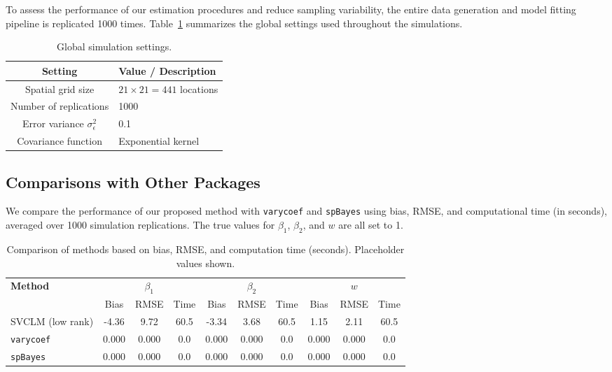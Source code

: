 To assess the performance of our estimation procedures and reduce sampling variability, the entire data generation and model fitting pipeline is replicated 1000 times. Table~\ref{tab:settings} summarizes the global settings used throughout the simulations.

\begin{table}[ht!]
\centering
\caption{Global simulation settings.}
\label{tab:settings}
\begin{tabular}{|c|l|}
\hline
\textbf{Setting} & \textbf{Value / Description} \\
\hline
Spatial grid size & $ 21 \times 21 = 441 $ locations \\
Number of replications & 1000 \\
Error variance $ \sigma^2_\epsilon $ & 0.1 \\
Covariance function & Exponential kernel \\
\hline
\end{tabular}
\end{table}

\subsection{Comparisons with Other Packages}

We compare the performance of our proposed method with \texttt{varycoef} and \texttt{spBayes} using bias, RMSE, and computational time (in seconds), averaged over 1000 simulation replications. The true values for $ \beta_1 $, $ \beta_2 $, and $ w $ are all set to 1.

\begin{table}[ht!]
\centering
\caption{Comparison of methods based on bias, RMSE, and computation time (seconds). Placeholder values shown.}
\label{tab:method-compact}
\begin{tabular}{|l|ccc|ccc|ccc|}
\hline
\textbf{Method} 
& \multicolumn{3}{c|}{ $ \beta_1 $ } 
& \multicolumn{3}{c|}{ $ \beta_2 $ } 
& \multicolumn{3}{c|}{ $ w $ } \\
\cline{2-10}
& Bias & RMSE & Time 
& Bias & RMSE & Time 
& Bias & RMSE & Time \\
\hline
SVCLM (low rank)
& -4.36 & 9.72 & 60.5
& -3.34 & 3.68 & 60.5 
& 1.15 & 2.11 & 60.5 \\
\texttt{varycoef} 
& 0.000 & 0.000 & 0.0 
& 0.000 & 0.000 & 0.0 
& 0.000 & 0.000 & 0.0 \\
\texttt{spBayes} 
& 0.000 & 0.000 & 0.0 
& 0.000 & 0.000 & 0.0 
& 0.000 & 0.000 & 0.0 \\
\hline
\end{tabular}
\end{table}

